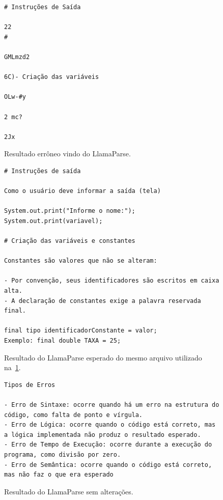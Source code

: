 \documentclass[journal]{IEEEtran}
\begin{document}
\begin{figure}[h]
    \centering
    \begin{verbatim}
# Instruções de Saída

22
#

GMLmzd2

6C)- Criação das variáveis

OLw-#y

2 mc?

2Jx
    \end{verbatim}
    \caption{Resultado errôneo vindo do LlamaParse.\label{fig:llamaparse_lixo}}
\end{figure}

\begin{figure}[h]
    \centering
    \begin{verbatim}
# Instruções de saída

Como o usuário deve informar a saída (tela)

System.out.print("Informe o nome:");
System.out.print(variavel);

# Criação das variáveis e constantes

Constantes são valores que não se alteram:

- Por convenção, seus identificadores são escritos em caixa alta.
- A declaração de constantes exige a palavra reservada final.

final tipo identificadorConstante = valor;
Exemplo: final double TAXA = 25;
    \end{verbatim}
    \caption{Resultado do LlamaParse esperado do mesmo arquivo utilizado na~\cref{fig:llamaparse_lixo}.\label{fig:llamaparse_corrigido}}
\end{figure}

\begin{figure}[h]
    \centering
    \begin{verbatim}
Tipos de Erros

- Erro de Sintaxe: ocorre quando há um erro na estrutura do código, como falta de ponto e vírgula.
- Erro de Lógica: ocorre quando o código está correto, mas a lógica implementada não produz o resultado esperado.
- Erro de Tempo de Execução: ocorre durante a execução do programa, como divisão por zero.
- Erro de Semântica: ocorre quando o código está correto, mas não faz o que era esperado
    \end{verbatim}
    \caption{Resultado do LlamaParse sem alterações.\label{fig:llamaparse_tipos_de_erros}}
\end{figure}
\end{document}
